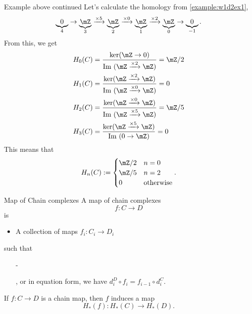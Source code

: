 \begin{example}{Example above continued}{}
    Let's calculate the homology from \ref{example:w1d2ex1}, $$\underbrace{0}_4\to \underbrace{\mZ}_3\xr{\by 5} \underbrace{\mZ}_2\xr{\by 0} \underbrace{\mZ}_1\xr{\by 2}\underbrace{\mZ}_0\to \underbrace{0}_{-1}.$$ From this, we get 
    \begin{align*}
        H_0(C)& =\frac{\ker (\mZ\to 0)}{\Im(\mZ\xr{\by 2}\mZ)} = \mZ/2\\
        H_1(C)& =\frac{\ker (\mZ\xr{\by 2} \mZ)}{\Im(\mZ\xr{\by 0}\mZ)} = 0\\
        H_2(C)& =\frac{\ker (\mZ\xr{\by 0} \mZ)}{\Im(\mZ\xr{\by 5}\mZ)} = \mZ/5\\
        H_3(C)& =\frac{\ker (\mZ\xr{\by 5} \mZ)}{\Im(0\to \mZ)} = 0\\
    \end{align*}
    This means that $$H_n(C):= \begin{cases}
        \mZ/2 & n = 0\\
        \mZ/5 & n= 2\\
        0 & \text{otherwise}
    \end{cases}.$$
\end{example}
\begin{definition}{Map of Chain complexes}{}
    A map of chain complexes $$f:C\to D$$ is
    \begin{itemize}
        \item A collection of maps $f_i:C_i\to D_i$
    \end{itemize}
    such that 
    \begin{itemize}
        \item[-]   , or in equation form, we have $d_i^D \circ f_i = f_{i-1}\circ d_i^C$. 
    \end{itemize}
\end{definition}
\begin{lemma}{}{}
    If $f:C\to D$ is a chain map, then $f$ induces a map $$H_\ast(f):H_\ast(C)\to H_\ast(D).$$
\end{lemma}
